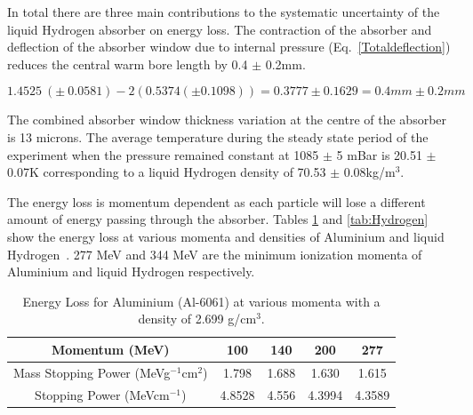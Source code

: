 In total there are three main contributions to the systematic uncertainty of the liquid Hydrogen absorber on energy loss. The contraction of the absorber and deflection of the absorber window due to internal pressure (Eq.~\ref{Totaldeflection}) reduces the central warm bore length by 0.4 $\mathrm{\pm}$ 0.2mm.

\begin{equation}
    1.4525\ \left(\pm \ 0.0581\right)-2\left(0.5374\left(\pm 0.1098\right)\right)=0.3777\pm 0.1629=0.4mm\pm 0.2mm
\label{Totaldeflection}    
\end{equation}

The combined absorber window thickness variation at the centre of the absorber is 13 microns. The average temperature during the steady state period of the experiment when the pressure remained constant at 1085 $\mathrm{\pm}$ 5 mBar is 20.51 $\mathrm{\pm}$ 0.07K corresponding to a liquid Hydrogen density of 70.53 $\mathrm{\pm}$ 0.08kg/m${}^{3}$.

The energy loss is momentum dependent as each particle will lose a different amount of energy passing through the absorber. Tables \ref{tab:Aluminium} and \ref{tab:Hydrogen} show the energy loss at various momenta and densities of Aluminium and liquid Hydrogen~\cite{AtomicAluminium}\cite{AtomicHydrogen}\cite{MuonAluminium}\cite{MuonliquidHydrogen}. 277 MeV and 344 MeV are the minimum ionization momenta of Aluminium and liquid Hydrogen respectively.


\begin{table}[htb!]
  \caption{
    Energy Loss for Aluminium (Al-6061) at various momenta with a density of 2.699 g/cm${}^{3}$.
  }
  \label{tab:Aluminium}
  \begin{center}
    \begin{tabular}{|c c c c c|}
    \hline

Momentum (MeV) & 100 & 140 & 200 & 277     \rule{0pt}{14pt} \\
\hline
{Mass Stopping Power (MeVg${}^{-1}$cm${}^{2}$)} & 1.798 & 1.688 & 1.630 & 1.615
\\
{Stopping Power (MeVcm${}^{-1}$)} & 4.8528 & 4.556 & 4.3994 & 4.3589
\\

    \hline
    \end{tabular}
  \end{center}
\end{table} 

